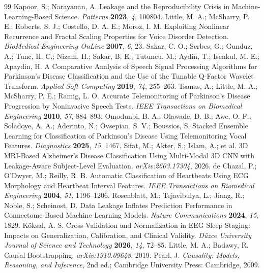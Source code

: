 \documentclass[11pt]{article}
\begin{document}
\begin{thebibliography}{99}
 Kapoor, S.; Narayanan, A. Leakage and the Reproducibility Crisis in Machine-Learning-Based Science. \textit{Patterns} \textbf{2023}, \textit{4}, 100804.
 Little, M. A.; McSharry, P. E.; Roberts, S. J.; Costello, D. A. E.; Moroz, I. M. Exploiting Nonlinear Recurrence and Fractal Scaling Properties for Voice Disorder Detection. \textit{BioMedical Engineering OnLine} \textbf{2007}, \textit{6}, 23.
 Sakar, C. O.; Serbes, G.; Gunduz, A.; Tunc, H. C.; Nizam, H.; Sakar, B. E.; Tutuncu, M.; Aydin, T.; Isenkul, M. E.; Apaydin, H. A Comparative Analysis of Speech Signal Processing Algorithms for Parkinson's Disease Classification and the Use of the Tunable Q-Factor Wavelet Transform. \textit{Applied Soft Computing} \textbf{2019}, \textit{74}, 255--263.
 Tsanas, A.; Little, M. A.; McSharry, P. E.; Ramig, L. O. Accurate Telemonitoring of Parkinson's Disease Progression by Noninvasive Speech Tests. \textit{IEEE Transactions on Biomedical Engineering} \textbf{2010}, \textit{57}, 884--893.
 Omodunbi, B. A.; Olawade, D. B.; Awe, O. F.; Soladoye, A. A.; Aderinto, N.; Ovsepian, S. V.; Boussios, S. Stacked Ensemble Learning for Classification of Parkinson's Disease Using Telemonitoring Vocal Features. \textit{Diagnostics} \textbf{2025}, \textit{15}, 1467.
 Sifat, M.; Akter, S.; Islam, A.; et al. 3D MRI-Based Alzheimer's Disease Classification Using Multi-Modal 3D CNN with Leakage-Aware Subject-Level Evaluation. \textit{arXiv:2603.17304}, 2026.
 de Chazal, P.; O'Dwyer, M.; Reilly, R. B. Automatic Classification of Heartbeats Using ECG Morphology and Heartbeat Interval Features. \textit{IEEE Transactions on Biomedical Engineering} \textbf{2004}, \textit{51}, 1196--1206.
 Rosenblatt, M.; Tejavibulya, L.; Jiang, R.; Noble, S.; Scheinost, D. Data Leakage Inflates Prediction Performance in Connectome-Based Machine Learning Models. \textit{Nature Communications} \textbf{2024}, \textit{15}, 1829.
 K{\"o}ksal, A. S. Cross-Validation and Normalization in EEG Sleep Staging: Impacts on Generalization, Calibration, and Clinical Validity. \textit{D{\"u}zce University Journal of Science and Technology} \textbf{2026}, \textit{14}, 72--85.
 Little, M. A.; Badawy, R. Causal Bootstrapping. \textit{arXiv:1910.09648}, 2019.
 Pearl, J. \textit{Causality: Models, Reasoning, and Inference}, 2nd ed.; Cambridge University Press: Cambridge, 2009.

\end{thebibliography}
\end{document}
